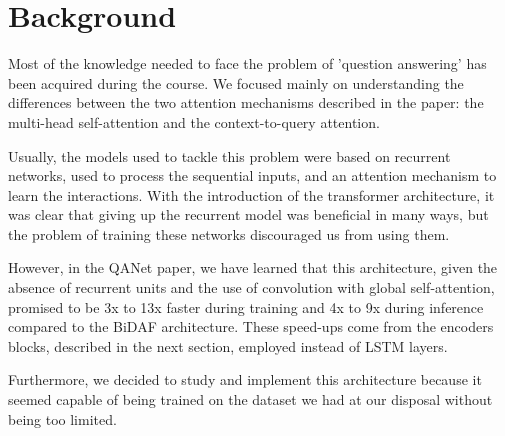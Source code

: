 \chapter{Background}
    Most of the knowledge needed to face the problem of 'question answering' has been acquired during the course. 
    We focused mainly on understanding the differences between the two attention mechanisms described in the paper: the multi-head
     self-attention and the context-to-query attention.

    Usually, the models used to tackle this problem were based on recurrent networks, used to process the sequential inputs, 
    and an attention mechanism to learn the interactions. 
    With the introduction of the transformer architecture, it was clear that giving up the recurrent model was beneficial 
    in many ways, but the problem of training these networks discouraged us from using them.

    However, in the QANet paper, we have learned that this architecture, given the absence of recurrent units and the use 
    of convolution with global self-attention, promised to be 3x to 13x faster during training and 4x to 9x during inference\cite{yu2018qanet}
     compared to the BiDAF\cite{seo2018bidirectional} architecture. These speed-ups come from the encoders blocks, 
    described in the next section, employed instead of LSTM layers.

    Furthermore, we decided to study and implement this architecture because it seemed capable of being trained on 
    the dataset we had at our disposal without being too limited.
